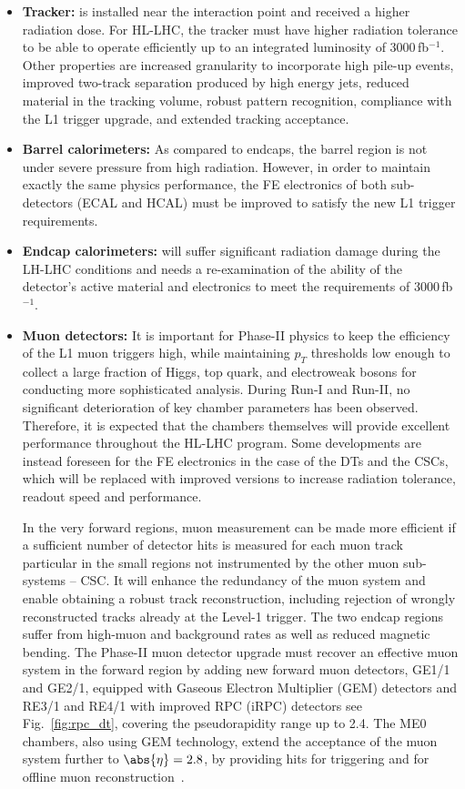 \begin{itemize}
\item{\textbf{Tracker:}}
is installed near the interaction point and received a higher radiation dose. For HL-LHC, the tracker must have higher radiation tolerance to be able to operate efficiently up to an integrated luminosity of 3000\,fb$^{-1}$. Other properties are increased granularity to incorporate high pile-up events, improved two-track separation produced by high energy jets, reduced material in the tracking volume, robust pattern recognition, compliance with the L1 trigger upgrade, and extended tracking acceptance.
\item{\textbf{Barrel calorimeters:}}
As compared to endcaps, the barrel region is not under severe pressure from high radiation. However, in order to maintain exactly the same physics performance, the FE electronics of both sub-detectors (ECAL and HCAL) must be improved to satisfy the new L1 trigger requirements.
\item{\textbf{Endcap calorimeters:}}
will suffer significant radiation damage during the LH-LHC conditions and needs a re-examination of the ability of the detector’s active material and electronics to meet the requirements of 3000\,fb$^{-1}$.
\item{\textbf{Muon detectors:}}
It is important for Phase-II physics to keep the efficiency of the L1 muon triggers high, while maintaining $p_T$ thresholds low enough to collect a large fraction of Higgs, top quark, and electroweak bosons for conducting more sophisticated analysis. During Run-I and Run-II, no significant deterioration of key chamber parameters has been observed. Therefore, it is expected that the chambers themselves will provide excellent performance throughout the HL-LHC program. Some developments are instead foreseen for the FE electronics in the case of the DTs and the CSCs, which will be replaced with improved versions to increase radiation tolerance, readout speed and performance.

In the very forward regions, muon measurement can be made more efficient if a sufficient number of detector hits is measured for each muon track particular in the small regions not instrumented by the other muon sub-systems – CSC. It will enhance the redundancy of the muon system and enable obtaining a robust track reconstruction, including rejection of wrongly reconstructed tracks already at the Level-1 trigger. The two endcap regions suffer from high-muon and background rates as well as reduced magnetic bending. The Phase-II muon detector upgrade must recover an effective muon system in the forward region by adding new forward muon detectors, GE1/1 and GE2/1, equipped with Gaseous Electron Multiplier (GEM) detectors and RE3/1 and RE4/1 with improved RPC (iRPC) detectors see Fig.~\ref{fig:rpc_dt}, covering the pseudorapidity range up to 2.4. The ME0 chambers, also using GEM technology, extend the acceptance of the muon system further to $\abs{\eta} = 2.8$, by providing hits for triggering and for offline muon reconstruction~\cite{Collaboration:2283189}.


\end{itemize}
